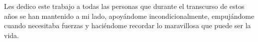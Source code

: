 \begin{dedication}
Les dedico este trabajo a todas las personas que durante el transcurso de estos a\~nos se han mantenido a mi lado, apoy\'andome incondicionalmente, empuj\'andome cuando necesitaba fuerzas y haci\'endome recordar lo maravillosa que puede ser la vida.
\end{dedication}